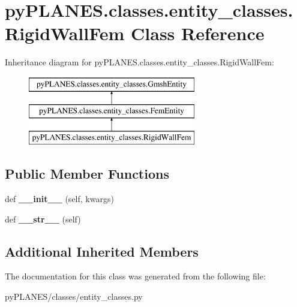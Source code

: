 \hypertarget{classpy_p_l_a_n_e_s_1_1classes_1_1entity__classes_1_1_rigid_wall_fem}{}\section{py\+P\+L\+A\+N\+E\+S.\+classes.\+entity\+\_\+classes.\+Rigid\+Wall\+Fem Class Reference}
\label{classpy_p_l_a_n_e_s_1_1classes_1_1entity__classes_1_1_rigid_wall_fem}
Inheritance diagram for py\+P\+L\+A\+N\+E\+S.\+classes.\+entity\+\_\+classes.\+Rigid\+Wall\+Fem\+:\begin{figure}[H]
\begin{center}
\leavevmode
\includegraphics[height=3.000000cm]{classpy_p_l_a_n_e_s_1_1classes_1_1entity__classes_1_1_rigid_wall_fem}
\end{center}
\end{figure}
\subsection*{Public Member Functions}
\begin{DoxyCompactItemize}
\item 
\mbox{\label{classpy_p_l_a_n_e_s_1_1classes_1_1entity__classes_1_1_rigid_wall_fem_a72f1e21db6dcd43a75ac948bcfcd15b2}} 
def {\bfseries \+\_\+\+\_\+init\+\_\+\+\_\+} (self, kwargs)
\item 
\mbox{\label{classpy_p_l_a_n_e_s_1_1classes_1_1entity__classes_1_1_rigid_wall_fem_a3250eded3fc49e0fc5ca53d065cbd937}} 
def {\bfseries \+\_\+\+\_\+str\+\_\+\+\_\+} (self)
\end{DoxyCompactItemize}
\subsection*{Additional Inherited Members}


The documentation for this class was generated from the following file\+:\begin{DoxyCompactItemize}
\item 
py\+P\+L\+A\+N\+E\+S/classes/entity\+\_\+classes.\+py\end{DoxyCompactItemize}
